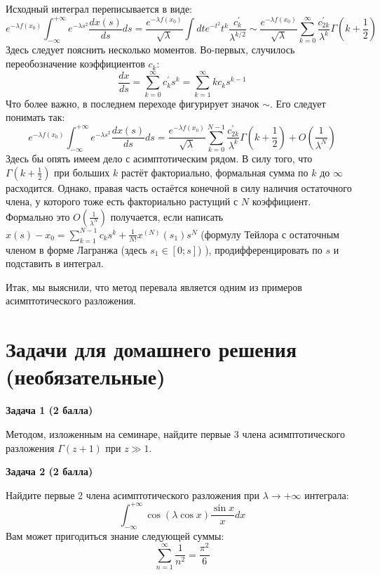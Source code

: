 \documentclass[a4paper,12pt]{article}
\begin{document}
\noindent
Исходный интеграл переписывается в виде:
$$
e^{-\lambda f(x_0)}\int_{-\infty}^{+\infty}e^{-\lambda s^2}\frac{dx(s)}{ds}ds=\frac{e^{-\lambda f(x_0)}}{\sqrt{\lambda}}\int dt e^{-t^2}t^k \frac{c^{'}_k}{\lambda^{k/2}}\sim\frac{e^{-\lambda f(x_0)}}{\sqrt{\lambda}}\sum_{k=0}^{\infty}\frac{c_{2k}^{'}}{\lambda^{k}}\Gamma\left(k+\frac{1}{2}\right)
$$
Здесь следует пояснить несколько моментов. Во-первых, случилось переобозначение коэффициентов $c_k$:
$$
\frac{dx}{ds}=\sum_{k=0}^{\infty}c_k^{'}s^k=\sum_{k=1}^{\infty}kc_{k}s^{k-1}
$$
Что более важно, в последнем переходе фигурирует значок $\sim$. Его следует понимать так:
$$
e^{-\lambda f(x_0)}\int_{-\infty}^{+\infty}e^{-\lambda s^2}\frac{dx(s)}{ds}ds=\frac{e^{-\lambda f(x_0)}}{\sqrt{\lambda}}\sum_{k=0}^{N-1}\frac{c_{2k}^{'}}{\lambda^{k}}\Gamma\left(k+\frac{1}{2}\right)+O\left(\frac{1}{\lambda^{N}}\right)
$$
Здесь бы опять имеем дело с асимптотическим рядом. В силу того, что $\Gamma\left(k+\frac{1}{2}\right)$ при больших $k$ растёт факториально, формальная сумма по $k$ до $\infty$ расходится. Однако, правая часть остаётся конечной в силу наличия остаточного члена, у которого тоже есть факториально растущий с $N$ коэффициент. Формально это $O\left(\frac{1}{\lambda^{N}}\right)$ получается, если написать $x(s)-x_0=\sum_{k=1}^{N-1}c_k s^k+\frac{1}{N!}x^{(N)}(s_1)s^{N}$ (формулу Тейлора с остаточным членом в форме Лагранжа (здесь $s_1\in[0;s]$) ), продифференцировать по $s$ и подставить в интеграл.

\noindent
Итак, мы выяснили, что метод перевала является одним из примеров асимптотического разложения.
\section*{Задачи для домашнего решения (необязательные)}

\noindent \textbf {Задача 1 (2 балла)} 

\noindent Методом, изложенным на семинаре, найдите первые 3 члена асимптотического разложения $\Gamma(z+1)$ при $z\gg1$.

\noindent \textbf {Задача 2 (2 балла)}

\noindent Найдите первые 2 члена асимптотического разложения при $\lambda\to+\infty$ интеграла:
$$
\int_{-\infty}^{+\infty}\cos\left(\lambda\cos x\right)\frac{\sin x}{x}dx
$$ 
Вам может пригодиться знание следующей суммы:
$$
\sum_{n=1}^{\infty}\frac{1}{n^2}=\frac{\pi^2}{6}
$$
\end{document}
